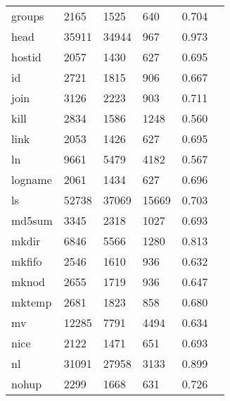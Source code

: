 \begin{longtable}{lp{2.40cm}p{2.40cm}p{2.40cm}p{2.40cm}p{2.40cm}}
groups    &                     2165 &         1525 &           640 &                    0.704 \\
head      &                    35911 &        34944 &           967 &                    0.973 \\
hostid    &                     2057 &         1430 &           627 &                    0.695 \\
id        &                     2721 &         1815 &           906 &                    0.667 \\
join      &                     3126 &         2223 &           903 &                    0.711 \\
kill      &                     2834 &         1586 &          1248 &                    0.560 \\
link      &                     2053 &         1426 &           627 &                    0.695 \\
ln        &                     9661 &         5479 &          4182 &                    0.567 \\
logname   &                     2061 &         1434 &           627 &                    0.696 \\
ls        &                    52738 &        37069 &         15669 &                    0.703 \\
md5sum    &                     3345 &         2318 &          1027 &                    0.693 \\
mkdir     &                     6846 &         5566 &          1280 &                    0.813 \\
mkfifo    &                     2546 &         1610 &           936 &                    0.632 \\
mknod     &                     2655 &         1719 &           936 &                    0.647 \\
mktemp    &                     2681 &         1823 &           858 &                    0.680 \\
mv        &                    12285 &         7791 &          4494 &                    0.634 \\
nice      &                     2122 &         1471 &           651 &                    0.693 \\
nl        &                    31091 &        27958 &          3133 &                    0.899 \\
nohup     &                     2299 &         1668 &           631 &                    0.726 \\

\end{longtable}
